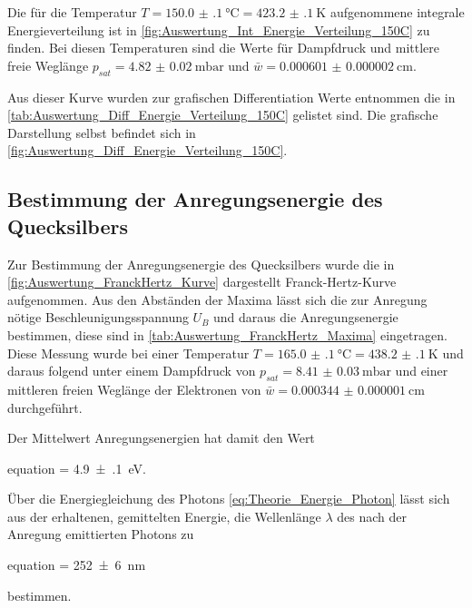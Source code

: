	Die für die Temperatur $T =\SI{150.0(1)}{\degreeCelsius} = \SI{423.2(1)}{\kelvin}$
	aufgenommene integrale Energieverteilung ist in \cref{fig:Auswertung_Int_Energie_Verteilung_150C}
	zu finden. Bei diesen Temperaturen sind die Werte für Dampfdruck und mittlere freie Weglänge
	$p_{sat} = \SI{4.82(2)}{\milli\bar}$ und $\bar{w} = \SI{0.000601(2)}{\cm}$. 
	
	
	Aus dieser Kurve wurden zur grafischen Differentiation Werte entnommen die in \cref{tab:Auswertung_Diff_Energie_Verteilung_150C} gelistet sind. Die grafische
	Darstellung selbst befindet sich in \cref{fig:Auswertung_Diff_Energie_Verteilung_150C}.
	
	
	
	
\subsection{Bestimmung der Anregungsenergie des Quecksilbers}
	
	Zur Bestimmung der Anregungsenergie des Quecksilbers wurde die in \cref{fig:Auswertung_FranckHertz_Kurve}
	dargestellt Franck-Hertz-Kurve aufgenommen. Aus den Abständen der Maxima lässt sich die zur
	Anregung nötige Beschleunigungsspannung $U_{B}$ und daraus die Anregungsenergie bestimmen, diese sind in 
	\cref{tab:Auswertung_FranckHertz_Maxima} eingetragen. Diese Messung wurde bei einer Temperatur
	$T =\SI{165.0(1)}{\degreeCelsius} = \SI{438.2(1)}{\kelvin}$ und daraus folgend unter einem Dampfdruck
	von $p_{sat} = \SI{8.41(3)}{\milli\bar}$ und einer mittleren freien Weglänge der Elektronen 
	von $\bar{w} = \SI{0.000344(1)}{\cm}$ durchgeführt.
	
	
	
	Der Mittelwert Anregungsenergien hat damit den Wert
	
	\begin{empheq}{equation}
		 = \SI{4.9(1)}{\eV}.
	\end{empheq}
	
	Über die Energiegleichung des Photons \cref{eq:Theorie_Energie_Photon} lässt sich aus der
	erhaltenen, gemittelten Energie, die Wellenlänge $\lambda$ des nach der Anregung emittierten Photons
	zu
	\begin{empheq}{equation}
		\lambda = \SI{252(6)}{\nm}
	\end{empheq}	 	
	bestimmen.
		 	
